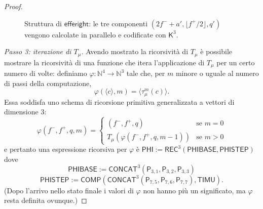\begin{proof}
\begin{figure}[H]
\caption{Struttura di $\mathsf{efferight}$: le tre componenti $(2f^-+a',\lfloor f^+/2\rfloor,q')$ vengono calcolate in parallelo e codificate con $\mathsf K^3$.}
\label{fig:efferight}
\end{figure}

\medskip
\noindent\emph{Passo 3: iterazione di $T_\mu$.}
Avendo mostrato la ricorsività di $T_\mu$ è possibile mostrare la ricorsività di una funzione che itera l'applicazione di $T_\mu$ per un certo numero di volte: definiamo $\varphi\colon\mathbb N^4\to\mathbb N^3$ tale che, per $m$ minore o uguale al numero di passi della computazione,
\[
\varphi(\langle c\rangle,m)=\langle\tau_\mu^m(c)\rangle.
\]
Essa soddisfa uno schema di ricorsione primitiva generalizzata a vettori di dimensione $3$:
\[
\varphi(f^-,f^+,q,m)=
\begin{cases}
(f^-,f^+,q) & \text{se } m=0\\
T_\mu(\varphi(f^-,f^+,q,m-1)) & \text{se } m>0
\end{cases}
\]
e pertanto una espressione ricorsiva per $\varphi$ è $\mathsf{PHI}:=\mathsf{REC}^3(\mathsf{PHIBASE},\mathsf{PHISTEP})$ dove
\[
\mathsf{PHIBASE}:=\mathsf{CONCAT}^3(\mathsf P_{3,1},\mathsf P_{3,2},\mathsf P_{3,3})
\]
\[
\mathsf{PHISTEP}:=\mathsf{COMP}(\mathsf{CONCAT}^3(\mathsf P_{7,5},\mathsf P_{7,6},\mathsf P_{7,7}),\mathsf{TIMU}).
\]
(Dopo l'arrivo nello stato finale i valori di $\varphi$ non hanno più un significato, ma $\varphi$ resta definita ovunque.)


\end{proof}
